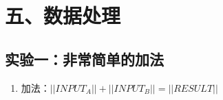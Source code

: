 \section*{五、数据处理}
        \subsection*{实验一：非常简单的加法}

        \begin{enumerate}
        	\item 加法：$ ||INPUT_A|| + ||INPUT_B|| = ||RESULT|| $
        \end{enumerate}